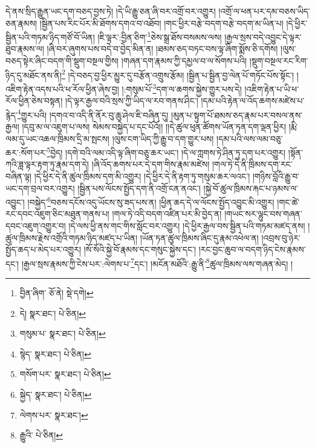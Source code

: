 དེ་ནས་སྲིད་རྒྱུན་ཡང་དག་བཅད་བྱས་ཏེ། །དེ་ཡི་རྒྱུ་ཅན་ཞི་བར་འགྲོ་བར་འགྱུར། །འགྲོ་ལ་ཕན་པར་དམ་བཅས་ཡིད་ཅན་རྣམས། །སྦྱིན་པས་རིང་པོར་མི་ཐོགས་དགའ་བ་འཐོབ། །གང་ཕྱིར་བརྩེ་བདག་བརྩེ་བདག་མ་ཡིན་པ། །དེ་ཕྱིར་སྦྱིན་པའི་གཏམ་ཉིད་གཙོ་བོ་ཡིན། །ཇི་ལྟར་:བྱིན་ཅིག་\footnote{བྱིན་ཞིག་  ཅོ་ནེ།  སྡེ་དགེ། }ཅེས་སྒྲ་ཐོས་བསམས་ལས། །རྒྱལ་སྲས་བདེ་འབྱུང་དེ་ལྟར་ཐུབ་རྣམས་ལ། །ཞི་བར་ཞུགས་པས་བདེ་བ་བྱེད་མིན་ན། །ཐམས་ཅད་བཏང་བས་ལྟ་ཞིག་སྨོས་ཅི་དགོས། །ལུས་བཅད་སྟེར་ཞིང་བདག་གི་སྡུག་བསྔལ་གྱིས། །གཞན་དག་རྣམས་ཀྱི་དམྱལ་བ་ལ་སོགས་པའི། །སྡུག་བསྔལ་རང་རིག་ཉིད་དུ་མཐོང་ནས་ནི།\footnote{དེ།  སྣར་ཐང་།  པེ་ཅིན། } །དེ་བཅད་བྱ་ཕྱིར་མྱུར་དུ་བརྩོན་འགྲུས་རྩོམ། །སྦྱིན་པ་སྦྱིན་བྱ་ལེན་པོ་གཏོང་པོས་སྟོང་། །འཇིག་རྟེན་འདས་པའི་ཕ་རོལ་ཕྱིན་ཞེས་བྱ། །:གསུམ་པོ་\footnote{གསུམ་པ་  སྣར་ཐང་།  པེ་ཅིན། }དག་ལ་ཆགས་སྐྱེས་གྱུར་པས་དེ། །འཇིག་རྟེན་པ་ཡི་ཕ་རོལ་ཕྱིན་ཅེས་བསྟན། །དེ་ལྟར་རྒྱལ་བའི་སྲས་ཀྱི་ཡིད་ལ་རབ་གནས་ཤིང་། །དམ་པའི་རྟེན་ལ་འོད་ཆགས་མཛེས་པ་རྙེད་\footnote{སྙེད་  སྣར་ཐང་།  པེ་ཅིན། }གྱུར་པའི། །དགའ་བ་འདི་ནི་ནོར་བུ་ཆུ་ཤེལ་ཇི་བཞིན་དུ། །མུན་པ་སྟུག་པོ་ཐམས་ཅད་རྣམ་པར་བསལ་ནས་རྒྱལ། །དབུ་མ་ལ་འཇུག་པ་ལས། སེམས་བསྐྱེད་པ་དང་པོའོ།། །།དེ་ཚུལ་ཕུན་ཚོགས་ཡོན་ཏན་དག་ལྡན་ཕྱིར། །རྨི་ལམ་དུ་ཡང་འཆལ་ཁྲིམས་དྲི་མ་སྤངས། །ལུས་ངག་ཡིད་ཀྱི་རྒྱུ་བ་དག་གྱུར་པས། །དམ་པའི་ལས་ལམ་བཅུ་ཆར་:སོག་པར་\footnote{གསོག་པར་  སྣར་ཐང་།  པེ་ཅིན། }བྱེད། །དགེ་བའི་ལམ་འདི་ལྟ་ཞིག་བཅུ་ཆར་ཡང་། །དེ་ལ་ཀླགས་ཏེ་ཤིན་ཏུ་དག་པར་འགྱུར། །སྟོན་ཀའི་ཟླ་ལྟར་རྟག་ཏུ་རྣམ་དག་དེ། །ཞི་འོད་ཆགས་པར་དེ་དག་གིས་རྣམ་མཛེས། །གལ་ཏེ་དེ་ནི་ཁྲིམས་དག་རང་བཞིན་ལྟ། །དེ་ཕྱིར་དེ་ནི་ཚུལ་ཁྲིམས་དག་མི་འགྱུར། །དེ་ཕྱིར་དེ་ནི་རྟག་ཏུ་གསུམ་ཆར་ལའང་། །གཉིས་བློའི་རྒྱུ་བ་ཡང་དག་བྲལ་བར་འགྱུར། །སྦྱིན་པས་ལོངས་སྤྱོད་དག་ནི་འགྲོ་ངན་ནའང་། །སྐྱེ་བོ་ཚུལ་ཁྲིམས་རྐང་པ་ཉམས་ལ་འབྱུང་། །བསྐྱེད་\footnote{སྐྱེད་  སྣར་ཐང་།  པེ་ཅིན། }བཅས་དངོས་འདུ་ཡོངས་སུ་ཟད་པས་ན། །ཕྱིན་ཆད་དེ་ལ་ལོངས་སྤྱོད་འབྱུང་མི་འགྱུར། །གང་ཚེ་རང་དབང་འཇུག་ཅིང་མཐུན་གནས་པ། །གལ་ཏེ་འདི་བདག་འཛིན་པར་མི་བྱེད་ན། །གཡང་སར་ལྷུང་བས་གཞན་དབང་འཇུག་འགྱུར་བ། །དེ་ལས་ཕྱི་ནས་གང་གིས་སློང་བར་འགྱུར། །དེ་ཕྱིར་རྒྱལ་བས་སྦྱིན་པའི་གཏམ་མཛད་ནས། །ཚུལ་ཁྲིམས་རྗེས་འགྲོའི་གཏམ་ཉིད་མཛད་པ་ཡིན། །ཡོན་ཏན་ཚུལ་ཁྲིམས་ཞིང་དུ་རྣམ་འཕེལ་ན། །འབྲས་བུ་ཉེར་སྤྱོད་ཆད་པ་མེད་པར་འགྱུར། །སོ་སོའི་སྐྱེ་བོ་རྣམས་དང་གསུང་སྐྱེས་དང་། །རང་བྱང་ཆུབ་ལ་བདག་ཉིད་ངེས་རྣམས་དང་། །རྒྱལ་སྲས་རྣམས་ཀྱི་ངེས་པར་:ལེགས་པ་\footnote{ལེགས་པར་  སྣར་ཐང་། }དང་། །མངོན་མཐོའི་:རྒྱུ་ནི་\footnote{རྒྱུའི་  པེ་ཅིན། }ཚུལ་ཁྲིམས་ལས་གཞན་མེད། །

